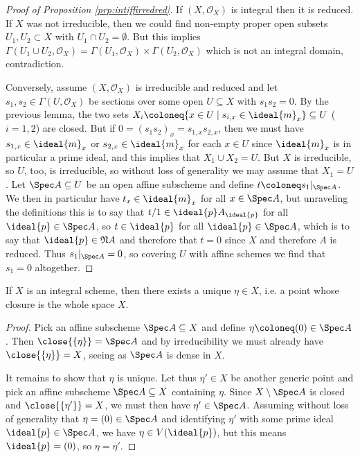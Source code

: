 \documentclass[wip, algebra]{bsteffan-lecturenotes}
\newcommand{\cO}{\mathcal{O}}
\newcommand{\Nil}{\mathfrak{N}}
\begin{document}
\begin{proof}[Proof of Proposition \ref{prp:intiffirredred}]
	If $(X, \cO_X)$ is integral then it is reduced.
	If $X$ was not irreducible, then we could find non-empty proper open subsets $U_1, U_2 \subset X$ with $U_1 \cap U_2 = \emptyset$.
	But this implies $\Gamma(U_1 \cup U_2, \cO_X) = \Gamma(U_1, \cO_X) \times \Gamma(U_2, \cO_X)$ which is not an integral domain, contradiction.

	Conversely, assume $(X, \cO_X)$ is irreducible and reduced and let $s_1, s_2 \in \Gamma(U, \cO_X)$ be sections over some open $U \subseteq X$ with $s_1 s_2 = 0$.
	By the previous lemma, the two sets $X_i \coloneq \{x \in U \mid s_{i, x} \in \ideal{m}_x\}	\subseteq U$ ($i = 1, 2$) are closed.
	But if $0 = (s_1 s_2)_x = s_{1, x} s_{2, x}$, then we must have $s_{1, x} \in \ideal{m}_x$ or $s_{2, x} \in \ideal{m}_x$ for each $x \in U$ since $\ideal{m}_x$ is in particular a prime ideal, and this implies that $X_1 \cup X_2 = U$.
	But $X$ is irreducible, so $U$, too, is irreducible, so without loss of generality we may assume that $X_1 = U$.
	Let $\Spec A \subseteq U$ be an open affine subscheme and define $t\coloneq s_1|_{\Spec A}$.
	We then in particular have $t_x \in \ideal{m}_x$ for all $x \in \Spec A$, but unraveling the definitions this is to say that $t / 1 \in \ideal{p} A_{\ideal{p}}$ for all $\ideal{p} \in \Spec A$, so $t \in \ideal{p}$ for all $\ideal{p} \in \Spec A$, which is to say that $\ideal{p} \in \Nil A$ and therefore that $t = 0$ since $X$ and therefore $A$ is reduced.
	Thus $s_1|_{\Spec A} = 0$, so covering $U$ with affine schemes we find that $s_1 = 0$ altogether.
\end{proof}
\begin{corollary}
	If $X$ is an integral scheme, then there exists a unique  $\eta \in X$, i.e. a point whose closure is the whole space $X$.
\end{corollary}
\begin{proof}
	Pick an affine subscheme $\Spec A \subseteq X$ and define $\eta \coloneq (0) \in \Spec A$.
	Then $\close{\{\eta\}} = \Spec A$ and by irreducibility we must already have $\close{\{\eta\}} = X$, seeing as $\Spec A$ is dense in $X$.

	It remains to show that $\eta$ is unique.
	Let thus $\eta' \in X$ be another generic point and pick an affine subscheme $\Spec A \subseteq X$ containing $\eta$.
	Since $X \setminus \Spec A$ is closed and $\close{\{\eta'\}} = X$, we must then have $\eta' \in \Spec A$.
	Assuming without loss of generality that $\eta = (0) \in \Spec A$ and identifying $\eta'$ with some prime ideal $\ideal{p} \in \Spec A$, we have $\eta \in V(\ideal{p})$, but this means $\ideal{p} = (0)$, so $\eta = \eta'$.
\end{proof}
\end{document}
